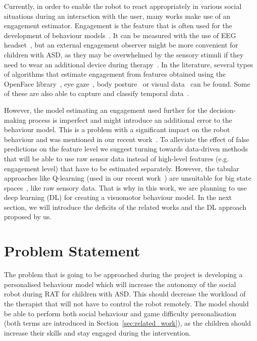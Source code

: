 \documentclass[thesis]{mas_proposal}
\begin{document}
Currently, in order to enable the robot to react appropriately in various social situations during an interaction with the user, many works make use of an engagement estimator. Engagement is the feature that is often used for the development of behaviour models~\cite{senft2015sparc,senft2015human,tsiakas2018task,del2022learning}. It can be measured with the use of EEG headset~\cite{tsiakas2018task}, but an external engagement observer might be more convenient for children with ASD, as they may be overwhelmed by the sensory stimuli if they need to wear an additional device during therapy~\cite{javed2019robotic}. In the literature, several types of algorithms that estimate engagement from features obtained using the OpenFace library~\cite{baltrusaitis2018openface, jain2020modeling, kaur2019domain, karimah2021implementation}, eye gaze~\cite{khorrami2014system},  body posture~\cite{ritschel2017adapting} or visual data~\cite{mane2018engagement, del2020you} can be found. Some of these are also able to capture and classify temporal data~\cite{del2020you, karimah2021implementation}.

However, the model estimating an engagement used further for the decision-making process is imperfect and might introduce an additional error to the behaviour model. This is a problem with a significant impact on the robot behaviour and was mentioned in our recent work~\cite{stolarz2022learningbased}. To alleviate the effect of false predictions on the feature level we suggest turning towards data-driven methods that will be able to use raw sensor data instead of high-level features (e.g. engagement level) that have to be estimated separately. However, the tabular approaches like Q-learning (used in our recent work~\cite{stolarz2022learningbased}) are unsuitable for big state spaces~\cite{akalin2021reinforcement}, like raw sensory data. That is why in this work, we are planning to use deep learning (DL) for creating a visuomotor behaviour model. In the next section, we will introduce the deficits of the related works and the DL approach proposed by us.

\section{Problem Statement}
\label{sec:problem_statement}

The problem that is going to be approached during the project is developing a personalised behaviour model which will increase the autonomy of the social robot during RAT for children with ASD. This should decrease the workload of the therapist that will not have to control the robot remotely. The model should be able to perform both social behaviour and game difficulty personalisation (both terms are introduced in Section~\ref{sec:related_work}), as the children should increase their skills and stay engaged during the intervention.
\end{document}
